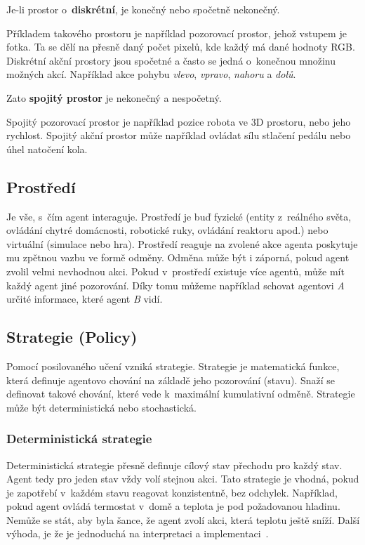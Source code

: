 Je-li prostor o~\textbf{diskrétní}, je konečný nebo spočetně nekonečný.

Příkladem takového prostoru je například pozorovací prostor, jehož vstupem je fotka.
Ta se dělí na přesně daný počet pixelů, kde každý má dané hodnoty RGB.\@
Diskrétní akční prostory jsou spočetné a často se jedná o~konečnou množinu možných akcí.
Například akce pohybu \textit{vlevo}, \textit{vpravo}, \textit{nahoru} a \textit{dolů}.

Zato \textbf{spojitý prostor} je nekonečný a nespočetný.

Spojitý pozorovací prostor je například pozice robota ve 3D prostoru, nebo jeho rychlost.
Spojitý akční prostor může například ovládat sílu stlačení pedálu nebo úhel natočení kola.

\subsection{Prostředí}\label{subsec:prostredi2}

Je vše, s~čím agent interaguje.
Prostředí je buď fyzické (entity z~reálného světa, ovládání chytré domácnosti, robotické ruky, ovládání reaktoru apod.) nebo virtuální (simulace nebo hra).
Prostředí reaguje na zvolené akce agenta poskytuje mu zpětnou vazbu ve formě odměny.
Odměna může být i záporná, pokud agent zvolil velmi nevhodnou akci.
Pokud v~prostředí existuje více agentů, může mít každý agent jiné pozorování.
Díky tomu můžeme například schovat agentovi \textit{A} určité informace, které agent \textit{B} vidí.

\subsection{Strategie (Policy)}\label{subsec:strategie}

Pomocí posilovaného učení vzniká strategie.
Strategie je matematická funkce, která definuje agentovo chování na základě jeho pozorování (stavu).
Snaží se definovat takové chování, které vede k~maximální kumulativní odměně.
Strategie může být deterministická nebo stochastická.

  \subsubsection*{Deterministická strategie}
  
  Deterministická strategie přesně definuje cílový stav přechodu pro každý stav.
  Agent tedy pro jeden stav vždy volí stejnou akci.
  Tato strategie je vhodná, pokud je zapotřebí v~každém stavu reagovat konzistentně, bez odchylek.
  Například, pokud agent ovládá termostat v~domě a teplota je pod požadovanou hladinu.
  Nemůže se stát, aby byla šance, že agent zvolí akci, která teplotu ještě sníží.
  Další výhoda, je že je jednoduchá na interpretaci a implementaci~\cite{Policies}.


